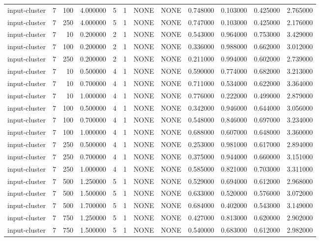 \begin{tabular}{lrrrllllrrrr}
input-cluster & 7 & 100 & 4.000000 & 5 & 1 & NONE & NONE & 0.748000 & 0.103000 & 0.425000 & 2.765000 \\
input-cluster & 7 & 250 & 4.000000 & 5 & 1 & NONE & NONE & 0.747000 & 0.103000 & 0.425000 & 2.176000 \\
input-cluster & 7 & 10 & 0.200000 & 2 & 1 & NONE & NONE & 0.543000 & 0.964000 & 0.753000 & 3.429000 \\
input-cluster & 7 & 100 & 0.200000 & 2 & 1 & NONE & NONE & 0.336000 & 0.988000 & 0.662000 & 3.012000 \\
input-cluster & 7 & 250 & 0.200000 & 2 & 1 & NONE & NONE & 0.211000 & 0.994000 & 0.602000 & 2.739000 \\
input-cluster & 7 & 10 & 0.500000 & 4 & 1 & NONE & NONE & 0.590000 & 0.774000 & 0.682000 & 3.213000 \\
input-cluster & 7 & 10 & 0.700000 & 4 & 1 & NONE & NONE & 0.711000 & 0.534000 & 0.622000 & 3.364000 \\
input-cluster & 7 & 10 & 1.000000 & 4 & 1 & NONE & NONE & 0.776000 & 0.222000 & 0.499000 & 2.879000 \\
input-cluster & 7 & 100 & 0.500000 & 4 & 1 & NONE & NONE & 0.342000 & 0.946000 & 0.644000 & 3.056000 \\
input-cluster & 7 & 100 & 0.700000 & 4 & 1 & NONE & NONE & 0.548000 & 0.846000 & 0.697000 & 3.234000 \\
input-cluster & 7 & 100 & 1.000000 & 4 & 1 & NONE & NONE & 0.688000 & 0.607000 & 0.648000 & 3.360000 \\
input-cluster & 7 & 250 & 0.500000 & 4 & 1 & NONE & NONE & 0.253000 & 0.981000 & 0.617000 & 2.894000 \\
input-cluster & 7 & 250 & 0.700000 & 4 & 1 & NONE & NONE & 0.375000 & 0.944000 & 0.660000 & 3.151000 \\
input-cluster & 7 & 250 & 1.000000 & 4 & 1 & NONE & NONE & 0.585000 & 0.821000 & 0.703000 & 3.311000 \\
input-cluster & 7 & 500 & 1.250000 & 5 & 1 & NONE & NONE & 0.529000 & 0.694000 & 0.612000 & 2.968000 \\
input-cluster & 7 & 500 & 1.500000 & 5 & 1 & NONE & NONE & 0.633000 & 0.520000 & 0.576000 & 3.072000 \\
input-cluster & 7 & 500 & 1.700000 & 5 & 1 & NONE & NONE & 0.684000 & 0.402000 & 0.543000 & 3.149000 \\
input-cluster & 7 & 750 & 1.250000 & 5 & 1 & NONE & NONE & 0.427000 & 0.813000 & 0.620000 & 2.902000 \\
input-cluster & 7 & 750 & 1.500000 & 5 & 1 & NONE & NONE & 0.540000 & 0.683000 & 0.612000 & 2.982000 \\

\end{tabular}
